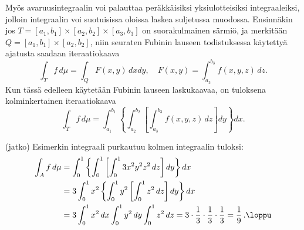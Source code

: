 Myös avaruusintegraalin voi palauttaa peräkkäisiksi yksiulotteisiksi integraaleiksi, jolloin 
integraalin voi suotuisissa oloissa laskea suljetussa muodossa. Ensinnäkin jos 
$T=[a_1,b_1]\times[a_2,b_2]\times[a_3,b_3]$ on suorakulmainen särmiö, ja merkitään
$Q=[a_1,b_1]\times[a_2,b_2]$, niin seuraten Fubinin lauseen todistuksessa käytettyä ajatusta
saadaan iteraatiokaava
\[ 
\int_T f\,d\mu = \int_Q F(x,y)\,dxdy, \quad F(x,y) = \int_{a_3}^{b_3} f(x,y,z)\,dz. 
\]
Kun tässä edelleen käytetään Fubinin lauseen laskukaavaa, on tuloksena kolminkertainen 
iteraatiokaava
\[
\int_T f\,d\mu = \int_{a_1}^{b_1}\left\{\int_{a_2}^{b_2}\left[\int_{a_3}^{b_3} 
                                                     f(x,y,z)\,dz\right]dy\right\}dx.
\]
\jatko \begin{Exa} (jatko) Esimerkin integraali purkautuu kolmen integraalin tuloksi:
\begin{align*}
\int_{A} f\,d\mu &= \int_0^1\left\{\int_0^1\left[\int_0^1 3x^2 y^2 z^2\,dz\right]dy\right\}dx \\
                 &= 3\int_0^1 x^2\left\{\int_0^1 y^2\left[\int_0^1 z^2\,dz\right]dy\right\}dx \\
                 &= 3\int_0^1 x^2\,dx \int_0^1 y^2\,dy \int_0^1 z^2\,dz
                  = 3\cdot\frac{1}{3}\cdot\frac{1}{3}\cdot\frac{1}{3} = \frac{1}{9}\,. \loppu
\end{align*}
\end{Exa}


